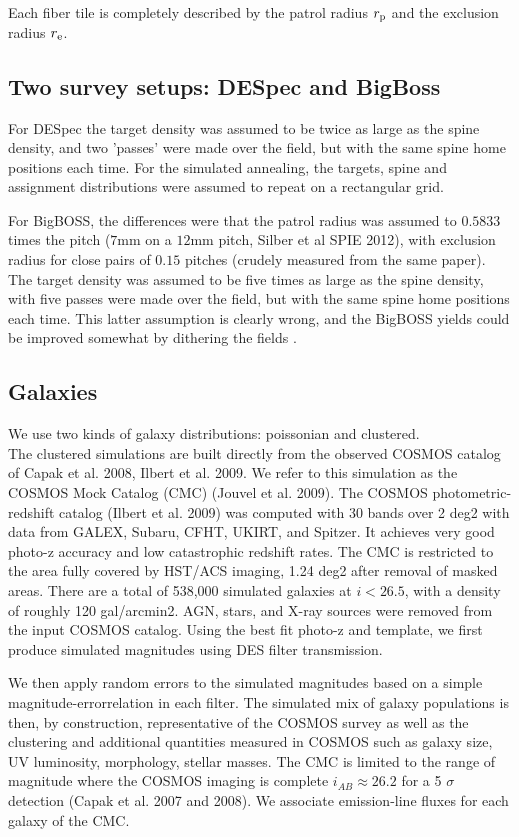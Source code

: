 \documentclass{article}
\begin{document}
Each fiber tile is completely described by the patrol radius $r_{\rm
  p}$ and the exclusion radius $r_{\rm e}$.

\subsection{Two survey setups: DESpec and BigBoss}
\label{sec:setups}


For DESpec the target density was assumed to be twice as large as the spine
density, and two 'passes' were made over the field, but with the same
spine home positions each time.  For the simulated annealing, the
targets, spine and assignment distributions were assumed to repeat on
a rectangular grid. 

For BigBOSS, the differences were that the patrol radius was assumed to
$0.5833$ times the pitch ($7$mm on a $12$mm pitch, Silber et al SPIE
2012), with exclusion radius for close pairs of $0.15$ pitches (crudely
measured from the same paper). The target density was assumed to be
five times as large as the spine density, with five passes were made
over the field, but with the same spine home positions each time. This
latter assumption is clearly wrong, and the BigBOSS yields could be
improved somewhat by dithering the fields . 


\subsection{Galaxies}
We use two kinds of galaxy distributions: poissonian and clustered. \\ 

The clustered simulations are built directly from the observed COSMOS
catalog of Capak et al. 2008, Ilbert et al. 2009. We refer to this
simulation as the COSMOS Mock Catalog (CMC) (Jouvel et al. 2009). The
COSMOS photometric-redshift catalog (Ilbert et al. 2009) was computed
with 30 bands over 2 deg2 with data from GALEX, Subaru, CFHT, UKIRT,
and Spitzer. It achieves very good photo-z accuracy and low
catastrophic redshift rates. The CMC is restricted to the area fully covered by HST/ACS imaging,
1.24 deg2 after removal of masked areas. There are a total of 538,000
simulated galaxies at $i<26.5$, with a density of roughly 120
gal/arcmin2. AGN, stars, and X-ray sources were removed from the input
COSMOS catalog. Using the best fit photo-z and template, we first
produce simulated magnitudes using DES filter transmission.

 We then apply random errors to the simulated magnitudes based on a
 simple magnitude-errorrelation in each filter. The simulated mix of
 galaxy populations is then, by construction, representative of the
 COSMOS survey as well as the clustering and additional quantities
 measured in COSMOS such as galaxy size, UV luminosity, morphology,
 stellar masses. The CMC is limited to the range of magnitude where
 the COSMOS imaging is complete $i_{AB} \approx 26.2$ for a 5 $\sigma$
 detection (Capak et al. 2007 and 2008). We associate emission-line
 fluxes for each galaxy of the CMC. 
\end{document}
